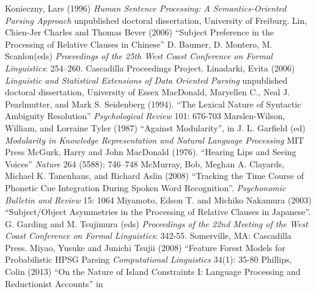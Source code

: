 \documentclass[a4paper]{article}
\begin{document}
Konieczny, Lars (1996) {\it Human Sentence Processing:
A Semantics-Oriented Parsing Approach} unpublished doctoral dissertation, University of Freiburg.
\newline
\newline
Lin, Chien-Jer Charles  and Thomas Bever (2006) ``Subject Preference in the Processing of Relative Clauses in Chinese'' D. Baumer, D. Montero, M. Scanlon(eds) {\it Proceedings of the 25th West Coast Conference on Formal Linguistics}: 254–260. Cascadilla Proceedings Project.
\newline
\newline
Linadarki, Evita (2006) {\it Linguistic and Statistical Extensions of Data
Oriented Parsing} unpublished doctoral dissertation, University of Essex
\newline
\newline
MacDonald, Maryellen C., 
Neal J. Pearlmutter,
and Mark S. Seidenberg  (1994).  ``The Lexical Nature of Syntactic 
Ambiguity Resolution'' 
{\it Psychological Review} 101: 676-703
\newline
\newline
Marslen-Wilson, William, and Lorraine Tyler (1987) ``Against Modularity'', in J. L.
Garfield (ed) {\it Modularity in Knowledge Representation and Natural Language Processing}
MIT Press
\newline
\newline
McGurk, Harry and John MacDonald (1976). ``Hearing Lips and Seeing Voices'' {\it Nature} 264 (5588): 746–748
\newline
\newline
McMurray, Bob, Meghan A. Clayards, Michael K. Tanenhaus, and Richard Aslin  (2008) ``Tracking the Time Course of Phonetic Cue Integration During Spoken Word Recognition''. {\it Psychonomic Bulletin and Review} 15: 1064
\newline
\newline
Miyamoto, Edson T. and
Michiko Nakamura (2003) ``Subject/Object
Asymmetries
in the Processing
of Relative Clauses
in Japanese''.  G. Garding and M. Tsujimura (eds) {\it Proceedings of the 22nd Meeting of the West Coast Conference on Formal Linguistics}:  342-55. Somerville, MA: 
Cascadilla Press. 
\newline
\newline
Miyao, Yusuke  and Junichi Tsujii (2008) ``Feature Forest Models for
Probabilistic HPSG Parsing  {\it Computational Linguistics} 34(1): 35-80
\newline
\newline
Phillips, Colin (2013) ``On the Nature of Island Constraints I: Language Processing and Reductionist Accounts'' in
\end{document}
